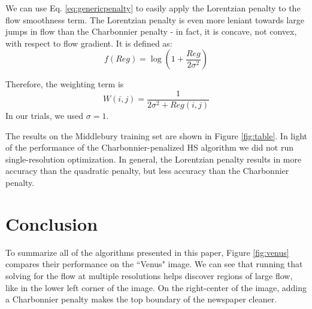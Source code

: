\documentclass[10pt,twocolumn,letterpaper]{article}
\begin{document}
We can use Eq. \ref{eq:genericpenalty} to easily apply the Lorentzian penalty to the flow smoothness term.  The Lorentzian penalty is even more leniant towards large jumps in flow than the Charbonnier penalty - in fact, it is concave, not convex, with respect to flow gradient.  It is defined as:
\begin{equation} \label{eq:lor}
f(Reg) = \log(1 + \frac{Reg}{2 \sigma^2})
\end{equation}

Therefore, the weighting term is
\begin{equation} \label{eq:lorweight}
W(i,j) = \frac{1}{2 \sigma^2 + Reg(i,j)}
\end{equation}
In our trials, we used $\sigma=1$.

The results on the Middlebury training set are shown in Figure \ref{fig:table}.  In light of the performance of the Charbonnier-penalized HS algorithm we did not run single-resolution optimization.  In general, the Lorentzian penalty results in more accuracy than the quadratic penalty, but less accuracy than the Charbonnier penalty.  

\section{Conclusion}

To summarize all of the algorithms presented in this paper, Figure \ref{fig:venus} compares their performance on the ``Venus" image.  We can see that running that solving for the flow at multiple resolutions helps discover regions of large flow, like in the lower left corner of the image.  On the right-center of the image, adding a Charbonnier penalty makes the top boundary of the newspaper cleaner.
\end{document}
